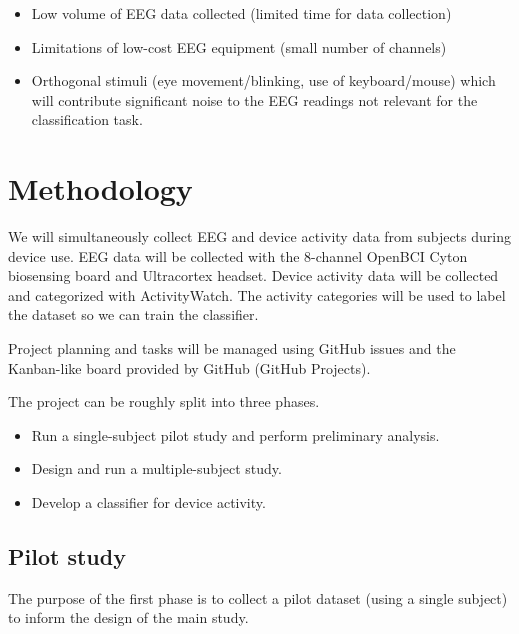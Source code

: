 \documentclass{IEEEtran}
\begin{document}
\begin{refsection}
\begin{itemize}
    \item Low volume of EEG data collected (limited time for data collection)
    \item Limitations of low-cost EEG equipment (small number of channels)
    \item Orthogonal stimuli (eye movement/blinking, use of keyboard/mouse) which will contribute significant noise to the EEG readings not relevant for the classification task.
\end{itemize}

\section{Methodology}


We will simultaneously collect EEG and device activity data from subjects during device use. EEG data will be collected with the 8-channel OpenBCI Cyton biosensing board and Ultracortex headset. Device activity data will be collected and categorized with ActivityWatch. The activity categories will be used to label the dataset so we can train the classifier.

Project planning and tasks will be managed using GitHub issues and the Kanban-like board provided by GitHub (GitHub Projects).

The project can be roughly split into three phases.

\begin{itemize}
 \item Run a single-subject pilot study and perform preliminary analysis.
 \item Design and run a multiple-subject study.
 \item Develop a classifier for device activity.
\end{itemize}

\subsection{Pilot study}

The purpose of the first phase is to collect a pilot dataset (using a single subject) to inform the design of the main study.


\end{refsection}
\end{document}
